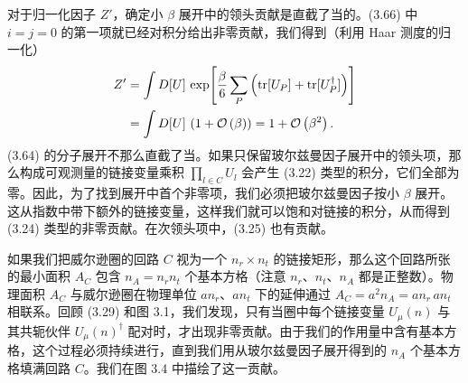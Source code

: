 对于归一化因子 $Z'$，确定小 $\beta$ 展开中的领头贡献是直截了当的。(3.66) 中 $i = j = 0$ 的第一项就已经对积分给出非零贡献，我们得到（利用 Haar 测度的归一化）
\begin{equation}
  \begin{split}
    Z' &= \int D[U]\,\exp\!\left[\frac{\beta}{6}\sum_P
      \left(\operatorname{tr}[U_P] + \operatorname{tr}[U_P^\dagger]\right)\right]\\
    &= \int D[U]\,\left(1 + \mathcal{O}\left(\beta\right)\right)
    = 1 + \mathcal{O}\left(\beta^2\right) .
  \end{split}
\end{equation}
(3.64) 的分子展开不那么直截了当。如果只保留玻尔兹曼因子展开中的领头项，那么构成可观测量的链接变量乘积 $\prod_{l\in C} U_l$ 会产生 (3.22) 类型的积分，它们全部为零。因此，为了找到展开中首个非零项，我们必须把玻尔兹曼因子按小 $\beta$ 展开。这从指数中带下额外的链接变量，这样我们就可以饱和对链接的积分，从而得到 (3.24) 类型的非零贡献。在次领头项中，(3.25) 也有贡献。

如果我们把威尔逊圈的回路 $C$ 视为一个 $n_r \times n_t$ 的链接矩形，那么这个回路所张的最小面积 $A_C$ 包含 $n_A = n_r n_t$ 个基本方格（注意 $n_r$、$n_t$、$n_A$ 都是正整数）。物理面积 $A_C$ 与威尔逊圈在物理单位 $a n_r$、$a n_t$ 下的延伸通过 $A_C = a^2 n_A = a n_r\, a n_t$ 相联系。回顾 (3.29) 和图 3.1，我们发现，只有当圈中每个链接变量 $U_\mu(n)$ 与其共轭伙伴 $U_\mu(n)^\dagger$ 配对时，才出现非零贡献。由于我们的作用量中含有基本方格，这个过程必须持续进行，直到我们用从玻尔兹曼因子展开得到的 $n_A$ 个基本方格填满回路 $C$。我们在图 3.4 中描绘了这一贡献。


